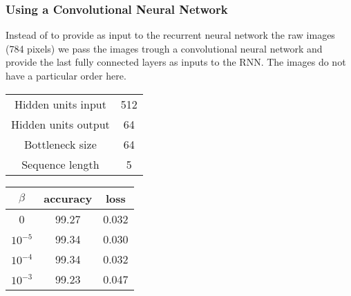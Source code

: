 \documentclass[11pt,oneside,openright]{report}
\begin{document}
\subsubsection{Using a Convolutional Neural Network}
Instead of to provide as input to the recurrent neural network the raw images (784 pixels) we pass the images trough a convolutional neural network and provide the last fully connected layers as inputs to the RNN. The images do not have a particular order here.

\begin{minipage}{0.35\textwidth}
        \centering
\begin{tabular}{ c | c  }
 Hidden units input & 512 \\
 Hidden units output & 64 \\
 Bottleneck size & 64 \\
 Sequence length & 5 \\
\end{tabular}
    \end{minipage}\hfill
    \begin{minipage}{0.8\textwidth}
        \centering
\begin{tabular}{ c | c c }
 $\beta$ & accuracy & loss \\
 \hline
0  &  99.27  & 0.032 \\
$10^{-5}$  & 99.34 & 0.030  \\
$10^{-4}$  & 99.34 & 0.032  \\
$10^{-3}$  & 99.23 & 0.047  \\
\end{tabular}
    \end{minipage}

\begin{center}
\end{center}
\end{document}
